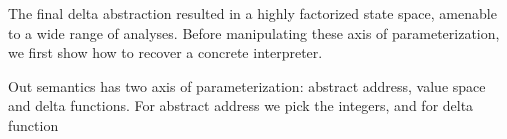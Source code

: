 The final delta abstraction resulted in a highly factorized state space,
amenable to a wide range of analyses.
%
Before manipulating these axis of parameterization, we first show how to
recover a concrete interpreter.


Out semantics has two axis of parameterization: abstract address, value space
and delta functions.
%
For abstract address we pick the integers, and for delta function
